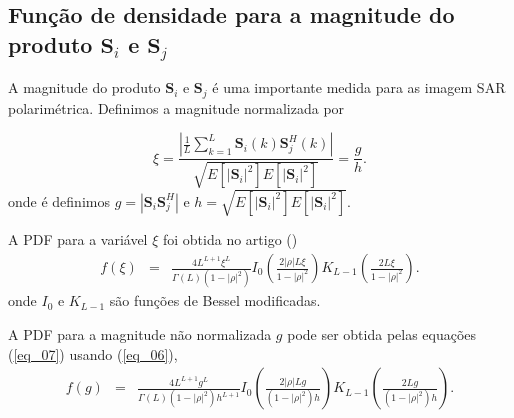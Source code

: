 \subsection{Função de densidade para a magnitude do produto $\mathbf{S}_i$ e $\mathbf{S}_j$}
A magnitude do produto $\mathbf{S}_i$ e $\mathbf{S}_j$ é uma importante medida para as imagem SAR polarimétrica. Definimos a magnitude normalizada por 

\begin{equation}\label{eq_06}
	\xi = \frac{\left|\frac{1}{L} \sum_{k=1}^L\mathbf{S}_i(k)\mathbf{S}_j^H(k) \right|}{\sqrt{E[|\mathbf{S}_i|^2]E[|\mathbf{S}_i|^2]}}=\frac{g}{h}.
\end{equation}
onde é definimos $g=|\mathbf{S}_i\mathbf{S}_j^H|$ e $h=\sqrt{E[|\mathbf{S}_i|^2]E[|\mathbf{S}_i|^2]}$.

A PDF para a variável  $\xi$ foi obtida no artigo (\cite{lee})
\begin{equation}\label{eq_07}
\begin{array}{ccc}
	f(\xi)&=&\frac{4L^{L+1}\xi^L}{\Gamma(L)(1-|\rho|^2)}I_0\left(\frac{2|\rho|L\xi}{1-|\rho|^2}\right)K_{L-1}\left(\frac{2L\xi}{1-|\rho|^2}\right).
		\end{array}
\end{equation}
onde $I_0$ e $K_{L-1}$ são funções de Bessel modificadas.

A PDF para a magnitude não normalizada $g$ pode ser obtida pelas equações (\ref{eq_07}) usando (\ref{eq_06}),
\begin{equation}
\begin{array}{ccc}\label{eq_08}
	f(g)&=&\frac{4L^{L+1}g^L}{\Gamma(L)(1-|\rho|^2)h^{L+1}}I_0\left(\frac{2|\rho|Lg}{(1-|\rho|^2)h}\right)K_{L-1}\left(\frac{2Lg}{(1-|\rho|^2)h}\right).
		\end{array}
\end{equation}

